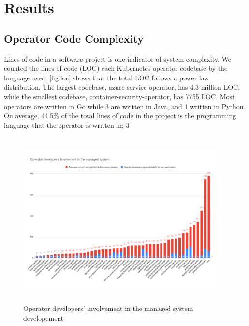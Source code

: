 \section{Results}
\label{sec:result}
\subsection{Operator Code Complexity}
Lines of code in a software project is one indicator of system complexity. We
counted the lines of code (LOC) each Kubernetes operator codebase by the
language used. \figurename{ \ref{fig:loc}} shows that the total LOC follows a
power law distribution. The largest codebase, azure-service-operator, has 4.3
million LOC, while the smallest codebase, container-security-operator, has 7755
LOC. Most operators are written in Go while 3 are written in Java, and 1
written in Python. On average, 44.5\% of the total lines of code in the project
is the programming language that the operator is written in; 3



\begin{figure}
    \centering
    \includegraphics[width=0.95\textwidth,height=9cm]{figures/operator-contributor-involvement-breakdown.png}
    \caption{Operator developers' involvement in the managed system developement}
    \label{fig:contributor}
\end{figure}

